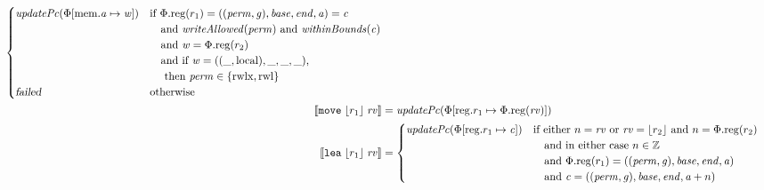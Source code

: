 \documentclass[a4paper]{article}
\newcommand{\update}[2]{[#1 \mapsto #2]}
\newcommand{\sem}[1]{\left\llbracket #1 \right\rrbracket}
\newcommand{\var}[1]{\mathit{#1}}
\newcommand{\rv}{\var{rv}}
\newcommand{\gl}{\var{g}}
\newcommand{\addr}{\var{a}}
\newcommand{\start}{\var{base}}
\newcommand{\addrend}{\var{end}}
\newcommand{\perm}{\var{perm}}
\newcommand{\stdcap}[1][(\perm,\gl)]{\left(#1,\start,\addrend,\addr \right)}
\newcommand{\plainproj}[1]{\mathrm{#1}}
\newcommand{\memreg}[1][\Phi]{#1.\plainproj{reg}}
\newcommand{\updateHeap}[3][\Phi]{#1\update{\plainproj{mem}.#2}{#3}}
\newcommand{\updateReg}[3][\Phi]{#1\update{\plainproj{reg}.#2}{#3}}
\newcommand{\failed}{\textsl{failed}}
\newcommand{\plainfun}[2]{
  \ifthenelse{\equal{#2}{}}
  {\mathit{#1}}
  {\mathit{#1}(#2)}
}
\newcommand{\writeAllowed}[1]{\plainfun{writeAllowed}{#1}}
\newcommand{\withinBounds}[1]{\plainfun{withinBounds}{#1}}
\newcommand{\stdUpdatePc}[1]{\plainfun{updatePc}{#1}}
\newcommand{\ints}{\mathbb{Z}}
\newcommand{\refreg}[1]{\lfloor #1 \rfloor}
\newcommand{\zinstr}[1]{\mathtt{#1}}
\newcommand{\twoinstr}[3]{\zinstr{#1} \; #2 \; #3}
\newcommand{\move}[2]{\twoinstr{move}{#1}{#2}}
\newcommand{\lea}[2]{\twoinstr{lea}{#1}{#2}}
\newcommand{\plainperm}[1]{\mathrm{#1}}
\newcommand{\readwritel}{\plainperm{rwl}}
\newcommand{\rwlx}{\plainperm{rwlx}}
\newcommand{\local}{\plainperm{local}}
\begin{document}
\begin{align*}
                                              \begin{cases}
                                                \stdUpdatePc{\updateHeap{\addr}{\var{w}}} &
                                                \arraycolsep=0pt
                                                \begin{array}[t]{l}
                                                  \text{if }\memreg(r_1) = \stdcap = \var{c} \\
                                                  \quad\text{and }\writeAllowed{\perm} \text{ and } \withinBounds{\var{c}} \\
                                                  \quad\text{and }\var{w} = \memreg(r_2)\\
                                                  \quad\text{and if } \var{w} = ((\_,\local),\_,\_,\_) \text{,} \\
                                                  \quad\text{ then } \perm \in \{\rwlx,\readwritel \}
                                                \end{array}\\
                                                \failed & \text{otherwise }
                                              \end{cases}\\
  \sem{\move{\refreg{r_1}}{\rv}}            & = \stdUpdatePc{\updateReg{r_1}{\memreg(\rv)}}
  \\
  \sem{\lea{\refreg{r_1}}{\rv}}            & =
                                             \begin{cases}
                                               \stdUpdatePc{\updateReg{r_1}{\var{c}}} &
                                               \arraycolsep=0pt
                                               \begin{array}[t]{l}
                                                 \text{if either $n = \rv$ or $\rv = \refreg{r_2}$ and $n = \memreg(r_2)$} \\
                                                 \quad\text{and in either case $n \in \ints $} \\
                                                 \quad\text{and $\memreg(r_1) = \stdcap$}\\
                                                 \quad\text{and $\var{c} = ((\perm,\gl),\start,\addrend,\addr + n)$}
                                               \end{array}\\

\end{cases}
\end{align*}
\end{document}
